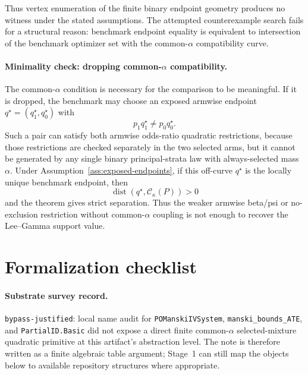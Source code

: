 \documentclass[11pt]{article}
\theoremstyle{definition}
\theoremstyle{plain}
\theoremstyle{remark}
\begin{document}
Thus vertex enumeration of the finite binary endpoint geometry produces no
witness under the stated assumptions.  The attempted counterexample search
fails for a structural reason: benchmark endpoint equality is equivalent to
intersection of the benchmark optimizer set with the common-\(\alpha\)
compatibility curve.

\paragraph{Minimality check: dropping common-\(\alpha\) compatibility.}
The common-\(\alpha\) condition is necessary for the comparison to be
meaningful.  If it is dropped, the benchmark may choose an exposed armwise
endpoint \(q^\star=(q_1^\star,q_0^\star)\) with
\[
  p_1q_1^\star\ne p_0q_0^\star.
\]
Such a pair can satisfy both armwise odds-ratio quadratic restrictions, because
those restrictions are checked separately in the two selected arms, but it
cannot be generated by any single binary principal-strata law with
always-selected mass \(\alpha\).  Under Assumption~\ref{ass:exposed-endpoints},
if this off-curve \(q^\star\) is the locally unique benchmark endpoint, then
\[
  \operatorname{dist}(q^\star,\mathcal C_\kappa(P))>0
\]
and the theorem gives strict separation.  Thus the weaker armwise beta/psi or
no-exclusion restriction without common-\(\alpha\) coupling is not enough to
recover the Lee--Gamma support value.

\section{Formalization checklist}
\paragraph{Substrate survey record.}
\texttt{bypass-justified}: local name audit for
\texttt{POManskiIVSystem}, \texttt{manski\_bounds\_ATE}, and
\texttt{PartialID.Basic} did not expose a direct finite common-\(\alpha\)
selected-mixture quadratic primitive at this artifact's abstraction level.  The
note is therefore written as a finite algebraic table argument; Stage~1 can
still map the objects below to available repository structures where
appropriate.
\end{document}
